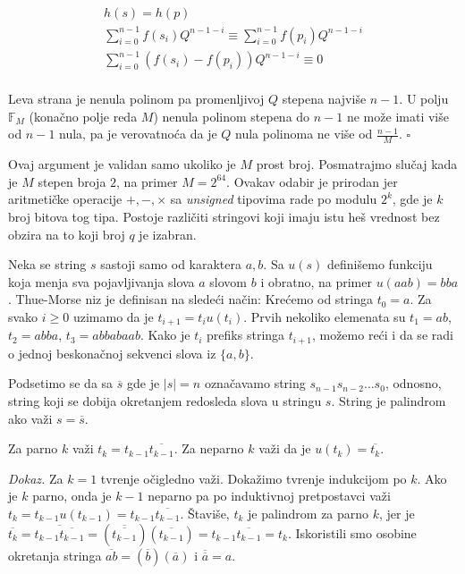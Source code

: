 \begin{gather*}
h(s) = h(p) \\
\sum_{i=0}^{n-1}f(s_i)Q^{n-1-i} \equiv  \sum_{i=0}^{n-1}f(p_i)Q^{n-1-i} \\
\sum_{i=0}^{n-1}(f(s_i)-f(p_i))Q^{n-1-i} \equiv 0 \\
\end{gather*}

Leva strana je nenula polinom pa promenljivoj $Q$ stepena najvi\v se $n-1$. U polju $\mathbb{F}_M$ (kona\v cno polje reda $M$) nenula polinom stepena do $n-1$ ne mo\v ze imati vi\v se od $n-1$ nula, pa je verovatno\' ca da je $Q$ nula polinoma ne vi\v se od $\frac{n-1}{M}$. \hfill $\square$

Ovaj argument je validan samo ukoliko je $M$ prost broj. Posmatrajmo slu\v caj kada je $M$ stepen broja $2$, na primer $M = 2^{64}$. Ovakav odabir je prirodan jer aritmeti\v cke operacije $+,-,\times$ sa \textit{unsigned} tipovima rade po modulu $2^k$, gde je $k$ broj bitova tog tipa. Postoje razli\v citi stringovi koji imaju istu he\v s vrednost bez obzira na to koji broj $q$ je izabran.

Neka se string $s$ sastoji samo od karaktera $a,b$. Sa $u(s)$ defini\v semo funkciju koja menja sva pojavljivanja slova $a$ slovom $b$ i obratno, na primer $u(aab) = bba$. Thue-Morse niz\cite{thuemorserad} je definisan na slede\' ci na\v cin: Kre\' cemo od stringa $t_0 = a$. Za svako $i \geq 0$ uzimamo da je $t_{i+1} = t_iu(t_i)$. Prvih nekoliko elemenata su $t_1 = ab$, $t_2 = abba$, $t_3 = abbabaab$. Kako je $t_i$ prefiks stringa $t_{i+1}$, mo\v zemo re\' ci i da se radi o jednoj beskona\v cnoj sekvenci slova iz $\{a,b\}$.

Podsetimo se da sa $\overline{s}$ gde je $|s|=n$ ozna\v cavamo string $s_{n-1}s_{n-2}\ldots s_0$, odnosno, string koji se dobija okretanjem redosleda slova u stringu $s$. String je palindrom ako va\v zi $s = \overline{s}$.

\begin{thm}
\label{thuemorseosobina}
Za parno $k$ va\v zi $t_k = t_{k-1}\overline{t_{k-1}}$. Za neparno $k$ va\v zi da je $u(t_{k}) = \overline{t_{k}}$.
\end{thm}

\textit{Dokaz.} Za $k=1$ tvr\dj enje o\v cigledno va\v zi. Doka\v zimo tvr\dj enje indukcijom po $k$. Ako je $k$ parno, onda je $k-1$ neparno pa po induktivnoj pretpostavci va\v zi $t_k = t_{k-1}u(t_{k-1}) = t_{k-1}\overline{t_{k-1}}$. \v Stavi\v se, $t_k$ je palindrom za parno $k$, jer je $\overline{t_k} = \overline{t_{k-1}\overline{t_{k-1}}} = (\overline{\overline{t_{k-1}}})(\overline{t_{k-1}}) = t_{k-1}\overline{t_{k-1}} = t_k$. Iskoristili smo osobine okretanja stringa $\overline{ab} = (\overline{b})(\overline{a})$ i $\overline{\overline{a}} = a$.

